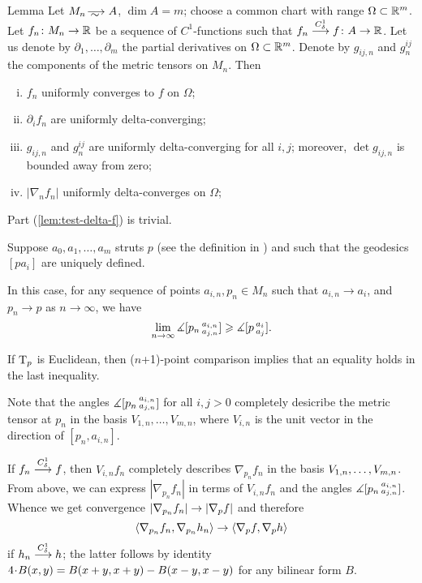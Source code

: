 \begin{thm}{Lemma}\label{lem:test-delta}
Let $M_n\smooths{} A$, $\dim A=m$;
choose a common chart with range $\Omega\subset \mathbb{R}^m$.
Let $f_n\colon M_n\to\mathbb{R}$ be a sequence of $C^1$-functions such that $f_n\zz\smoothto f\:A\to \RR$.
Let us denote by $\partial_1,\dots,\partial_m$ the partial derivatives on $\Omega\subset \mathbb{R}^m$.
Denote by $g_{ij,n}$ and $g^{ij}_n$ the components of the metric tensors on $M_n$.
Then 
\begin{enumerate}[(i)]
\item\label{lem:test-delta-f} $f_n$ uniformly converges to $f$ on $\Omega$;
\item\label{lem:test-delta-partial} $\partial_if_n$ are uniformly delta-converging;
\item\label{lem:test-delta-g}  $g_{ij,n}$ and $g^{ij}_n$ are uniformly delta-converging for all $i,j$;
moreover, $\det g_{ij,n}$ is bounded away from zero;
\item\label{lem:test-delta|nabla|} $|\nabla_n f_n|$ uniformly delta-converges on $\Omega$; %
\end{enumerate}

\end{thm}

Part (\ref{lem:test-delta-f}) is trivial.

Suppose $a_0, a_1,\dots,a_m$ struts $p$ (see the definition in \cite{AKP}) and such that the geodesics $[pa_i]$ are uniquely defined.

In this case, for any sequence of points $a_{i,n}, p_n\in M_n$ such that $a_{i,n}\to a_i$, and $p_n\to p$ as $n\to\infty$, we have
\[\lim_{n\to\infty}\measuredangle [p_n\,{}^{a_{i,n}}_{a_{j,n}}]\geqslant \measuredangle [p\,{}^{a_i}_{a_j}].\]

If $\mathrm{T}_p$ is Euclidean, then ($n$+1)-point comparison implies that an equality holds in the last inequality.

Note that the angles $\measuredangle [p_n\,{}^{a_{i,n}}_{a_{j,n}}]$ for all $i,j>0$ completely desicribe the metric tensor at $p_n$ in the basis $V_{1,n},\dots,V_{m,n}$, where $V_{i,n}$ is the unit vector in the direction of $[p_n,a_{i,n}]$.

If $f_n\zz\smoothto f$, then $V_{i,n}f_n$ completely describes $\nabla_{p_n}f_n$ in the basis $V_{1,n},\zz\dots,V_{m,n}$.
From above, we can express $|\nabla_{p_n}f_n|$ in terms of $V_{i,n}f_n$ and the angles $\measuredangle [p_n\,{}^{a_{i,n}}_{a_{j,n}}]$.
Whence we get convergence $|\nabla_{p_n} f_n|\zz\to |\nabla_{p} f|$ and therefore 
\[\langle \nabla_{p_n} f_n,\nabla_{p_n} h_n\rangle\zz\to \langle \nabla_p f,\nabla_p h\rangle\] if $h_n\stackrel{C^1_\delta}{\longrightarrow} h$; the latter follows by identity $4\cdot B(x,y)\zz=B(x\zz+y,x\zz+y)\zz-B(x\zz-y,x\zz-y)$ for any bilinear form $B$.

